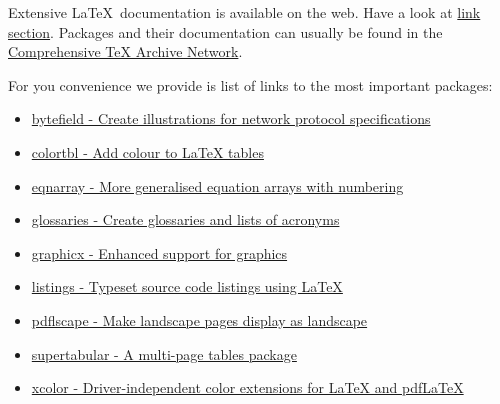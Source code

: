 Extensive \LaTeX\ documentation is available on the web.
Have a look at \href{http://cst.mi.fu-berlin.de/links/technical-writing.html}{link section}.
Packages and their documentation can usually be found in the \href{http://www.ctan.org/}{Comprehensive TeX Archive Network}.

For you convenience we provide is list of links to the most important packages:
\begin{itemize}
	\item \href{http://tug.ctan.org/cgi-bin/ctanPackageInformation.py?id=bytefield}{bytefield - Create illustrations for network protocol specifications}
	\item \href{http://tug.ctan.org/cgi-bin/ctanPackageInformation.py?id=colortbl}{colortbl - Add colour to LaTeX tables}
	\item \href{http://tug.ctan.org/cgi-bin/ctanPackageInformation.py?id=eqnarray}{eqnarray - More generalised equation arrays with numbering}
	\item \href{http://tug.ctan.org/cgi-bin/ctanPackageInformation.py?id=glossaries}{glossaries - Create glossaries and lists of acronyms}
	\item \href{http://tug.ctan.org/cgi-bin/ctanPackageInformation.py?id=graphicx}{graphicx - Enhanced support for graphics}
	\item \href{http://tug.ctan.org/cgi-bin/ctanPackageInformation.py?id=listings}{listings - Typeset source code listings using LaTeX}
	\item \href{http://tug.ctan.org/cgi-bin/ctanPackageInformation.py?id=pdflscape}{pdflscape - Make landscape pages display as landscape}
	\item \href{http://tug.ctan.org/cgi-bin/ctanPackageInformation.py?id=supertabular}{supertabular - A multi-page tables package}
	\item \href{http://tug.ctan.org/cgi-bin/ctanPackageInformation.py?id=xcolor}{xcolor - Driver-independent color extensions for LaTeX and pdfLaTeX}
\end{itemize}

